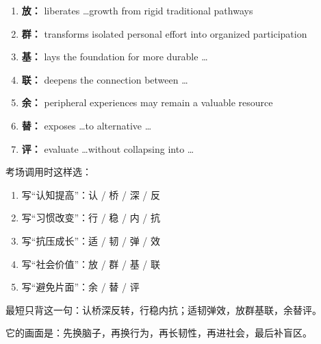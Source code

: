 ﻿\documentclass[lang=cn,11pt]{elegantbook}
\begin{document}
\begin{note}
\begin{enumerate}
  \item \textbf{放：} liberates \ldots growth from rigid traditional pathways
  \item \textbf{群：} transforms isolated personal effort into organized participation
  \item \textbf{基：} lays the foundation for more durable \ldots
  \item \textbf{联：} deepens the connection between \ldots

  \item \textbf{余：} peripheral experiences may remain a valuable resource
  \item \textbf{替：} exposes \ldots to alternative \ldots
  \item \textbf{评：} evaluate \ldots without collapsing into \ldots
\end{enumerate}

考场调用时这样选：

\begin{enumerate}
  \item 写“认知提高”：认 / 桥 / 深 / 反
  \item 写“习惯改变”：行 / 稳 / 内 / 抗
  \item 写“抗压成长”：适 / 韧 / 弹 / 效
  \item 写“社会价值”：放 / 群 / 基 / 联
  \item 写“避免片面”：余 / 替 / 评
\end{enumerate}

最短只背这一句：认桥深反转，行稳内抗；适韧弹效，放群基联，余替评。

它的画面是：先换脑子，再换行为，再长韧性，再进社会，最后补盲区。
\end{note}
\end{document}
